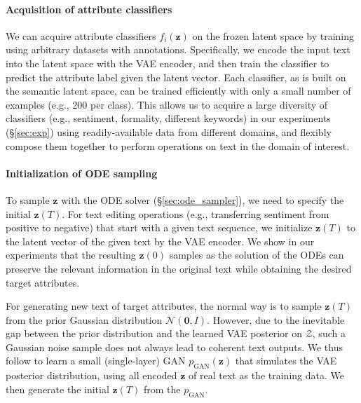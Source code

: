 \documentclass[11pt]{article}
\begin{document}
\paragraph{Acquisition of attribute classifiers}
We can acquire attribute classifiers $f_i(\bm{z})$ on the frozen latent space by training using arbitrary datasets with annotations. Specifically, we encode the input text into the latent space with the VAE encoder, and then train the classifier to predict the attribute label given the latent vector. Each classifier, as is built on the semantic latent space, can be trained efficiently with only a small number of examples (e.g., 200 per class). This allows us to acquire a large diversity of classifiers (e.g., sentiment, formality, different keywords) in our experiments (\S\ref{sec:exp}) using readily-available data from different domains, and flexibly compose them together to perform operations on text in the domain of interest. 


\paragraph{Initialization of ODE sampling}

To sample $\bm{z}$ with the ODE solver (\S\ref{sec:ode_sampler}), we need to specify the initial $\bm{z}(T)$. For text editing operations (e.g., transferring sentiment from positive to negative) that start with a given text sequence, we initialize $\bm{z}(T)$ to the latent vector of the given text by the VAE encoder. We show in our experiments that the resulting $\bm{z}(0)$ samples as the solution of the ODEs can preserve the relevant information in the original text while obtaining the desired target attributes.

For generating new text of target attributes, the normal way is to sample $\bm{z}(T)$ from the prior Gaussian distribution $\mathcal{N}(\bm 0, I)$. However, due to the inevitable gap between the prior distribution and the learned VAE posterior on $\mathcal{Z}$, such a Gaussian noise sample does not always lead to coherent text outputs. We thus follow \citep{li-etal-2020-optimus,hu2021causal} to learn a small (single-layer) GAN \citep{goodfellow2014generative} $p_{\text{GAN}}(\bm z)$ that simulates the VAE posterior distribution, using all encoded $\bm z$ of real text as the training data. We then generate the initial $\bm{z}(T)$ from the $p_{\text{GAN}}$.
\end{document}
